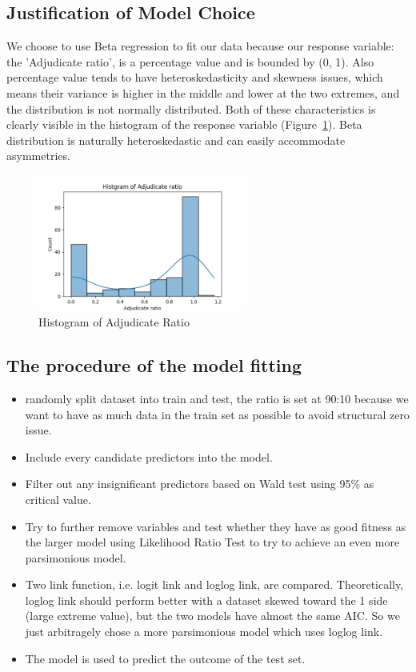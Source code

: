\documentclass[12pt, b4paper]{article}
\begin{document}
  \subsection{Justification of Model Choice}
  We choose to use Beta regression to fit our data because our response variable: the 'Adjudicate ratio', is a percentage value and is bounded by (0, 1). Also percentage value tends to have heteroskedasticity and skewness issues, which means their variance is higher in the middle and lower at the two extremes, and the distribution is not normally distributed. Both of these characteristics is clearly visible in the histogram of the response variable (Figure~\ref{fig:responseDist}). Beta distribution is naturally heteroskedastic and can easily accommodate asymmetries. 
  \begin{figure}
    \begin{center}
      \includegraphics[width=0.6\textwidth]{plots/AdjudicateRatioHist.png}
    \end{center}
    \caption{Histogram of Adjudicate Ratio}
    \label{fig:responseDist}
  \end{figure}

  \subsection{The procedure of the model fitting}
  \begin{itemize}
    \item randomly split dataset into train and test, the ratio is set at 90:10 because we want to have as much data in the train set as possible to avoid structural zero issue. 
    \item Include every candidate predictors into the model.
    \item Filter out any insignificant predictors based on Wald test using 95\% as critical value.
    \item Try to further remove variables and test whether they have as good fitness as the larger model using Likelihood Ratio Test to try to achieve an even more parsimonious model.
    \item Two link function, i.e. logit link and loglog link, are compared. Theoretically, loglog link should perform better with a dataset skewed toward the 1 side (large extreme value), but the two models have almost the same AIC. So we just arbitragely chose a more parsimonious model which uses loglog link. 
    \item The model is used to predict the outcome of the test set.
  \end{itemize}
\end{document}
